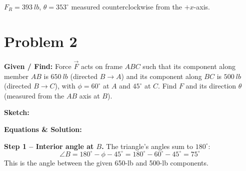 \documentclass[11pt]{article}
\newcommand{\eqlabel}[1]{\textbf{#1}}
\begin{document}
\begin{finalanswer}
    $F_R = \SI{393}{lb}$, \quad $\theta = 353^\circ$ measured counterclockwise from the $+x$-axis.
\end{finalanswer}

\clearpage
\section*{Problem 2}

\textbf{Given / Find:} Force $\vec{F}$ acts on frame $ABC$ such that its component along member $AB$ is $\SI{650}{lb}$ (directed $B\to A$) and its component along $BC$ is $\SI{500}{lb}$ (directed $B\to C$), with $\phi = 60^\circ$ at $A$ and $45^\circ$ at $C$. Find $F$ and its direction $\theta$ (measured from the $AB$ axis at $B$).

\textbf{Sketch:}
\begin{center}
\end{center}

\textbf{Equations \& Solution:}

\eqlabel{Step 1 -- Interior angle at $B$.} The triangle's angles sum to $180^\circ$:
\[
    \angle B = 180^\circ - \phi - 45^\circ = 180^\circ - 60^\circ - 45^\circ = 75^\circ
\]
This is the angle between the given 650-lb and 500-lb components.
\end{document}
